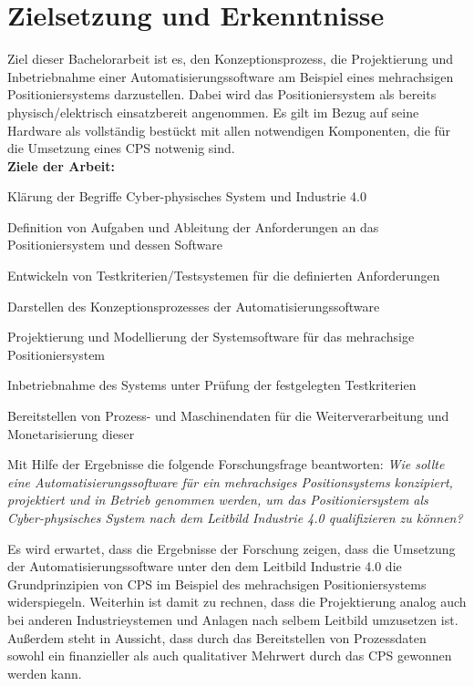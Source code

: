 \documentclass[12pt, a4paper, twoside]{article} %
\begin{document}
\section{Zielsetzung und Erkenntnisse}
Ziel dieser Bachelorarbeit ist es, den Konzeptionsprozess, die Projektierung und Inbetriebnahme einer Automatisierungssoftware am Beispiel eines mehrachsigen Positioniersystems darzustellen. Dabei wird das Positioniersystem als bereits physisch/elektrisch einsatzbereit angenommen. Es gilt im Bezug auf seine Hardware als vollständig bestückt mit allen notwendigen Komponenten, die für die Umsetzung eines CPS notwenig sind. \\
\textbf{Ziele der Arbeit:}
\begin{compactitem}
	\item Klärung der Begriffe Cyber-physisches System und Industrie 4.0
	\item Definition von Aufgaben und Ableitung der Anforderungen an das Positioniersystem und dessen Software
	\item Entwickeln von Testkriterien/Testsystemen für die definierten Anforderungen
	\item Darstellen des Konzeptionsprozesses der Automatisierungssoftware 
	\item Projektierung und Modellierung der Systemsoftware für das mehrachsige Positioniersystem
	\item Inbetriebnahme des Systems unter Prüfung der festgelegten Testkriterien
	\item Bereitstellen von Prozess- und Maschinendaten für die Weiterverarbeitung und Monetarisierung dieser
	\item Mit Hilfe der Ergebnisse die folgende Forschungsfrage beantworten: \textit{Wie sollte eine Automatisierungssoftware für ein mehrachsiges Positionsystems konzipiert, projektiert und in Betrieb genommen werden, um das Positioniersystem als Cyber-physisches System nach dem Leitbild Industrie 4.0 qualifizieren zu können?}
\end{compactitem}
Es wird erwartet, dass die Ergebnisse der Forschung zeigen, dass die Umsetzung der Automatisierungssoftware unter den dem Leitbild Industrie 4.0 die Grundprinzipien von CPS im Beispiel des mehrachsigen Positioniersystems widerspiegeln. Weiterhin ist damit zu rechnen, dass die Projektierung analog auch bei anderen Industrieystemen und Anlagen nach selbem Leitbild umzusetzen ist. Außerdem steht in Aussicht, dass durch das Bereitstellen von Prozessdaten sowohl ein finanzieller als auch qualitativer Mehrwert durch das CPS gewonnen werden kann. 
\end{document}

